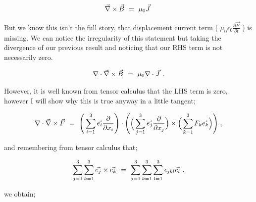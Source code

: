 \documentclass{article}
\begin{document}
\begin{equation} \label{eq:51}
\vec{\nabla} \times \vec{B} \hspace{0.125cm} = \hspace{0.125cm} \mu_{0} \vec{J} \hspace{0.125cm}
\end{equation}

But we know this isn't the full story, that displacement current term ( \begin{math} \mu_{0} \epsilon_{0} \frac{\partial{\vec{E}}}{\partial{t}} \end{math} ) is missing. We can notice the irregularity of this statement but taking the divergence of our previous result and noticing that our RHS term is not necessarily zero.

\begin{equation} \label{eq:51}
\nabla\cdot\vec{\nabla} \times \vec{B} \hspace{0.125cm} = \hspace{0.125cm} \mu_{0} \nabla\cdot\vec{J} \hspace{0.125cm} .
\end{equation}

However, it is well known from tensor calculus that the LHS term is zero, however I will show why this is true anyway in a little tangent; 

\begin{equation} \label{eq:51}
\nabla\cdot\vec{\nabla} \times \vec{F} \hspace{0.125cm} = \hspace{0.125cm} \Bigg( \sum_{i=1}^{3} \vec{e_{i}} \frac{\partial}{\partial x_i} \Bigg)\cdot\Bigg( \Big( \sum_{j=1}^{3} \vec{e_j} \frac{\partial}{\partial x_j} \Big)\times\Big( \sum_{k=1}^{3} F_k \vec{e_k}\Big) \Bigg) \hspace{0.125cm} ,
\end{equation}

and remembering from tensor calculus that;

\begin{equation} \label{eq:51}
\sum_{j=1}^{3} \sum_{k=1}^{3} \vec{e_j}\times\vec{e_k} \hspace{0.125cm} = \hspace{0.125cm} \sum_{j=1}^{3} \sum_{k=1}^{3} \sum_{l=1}^{3} \epsilon_{jkl} \vec{e_l} \hspace{0.125cm},
\end{equation}

we obtain; 
\end{document}
